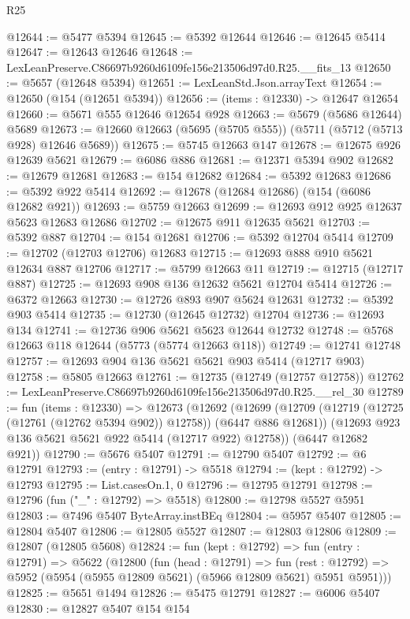 \begin{lexlean}{R25}
\begin{coremodule}
@12644 := @5477 @5394
@12645 := @5392 @12644
@12646 := @12645 @5414
@12647 := @12643 @12646
@12648 := LexLeanPreserve.C86697b9260d6109fe156e213506d97d0.R25.__fits_13
@12650 := @5657 (@12648 @5394)
@12651 := LexLeanStd.Json.arrayText
@12654 := @12650 (@154 (@12651 @5394))
@12656 := (items : @12330) -> @12647 @12654
@12660 := @5671 @555 @12646 @12654 @928
@12663 := @5679 (@5686 @12644) @5689
@12673 := @12660 @12663 (@5695 (@5705 @555)) (@5711 (@5712 (@5713 @928) @12646 @5689))
@12675 := @5745 @12663 @147
@12678 := @12675 @926 @12639 @5621
@12679 := @6086 @886
@12681 := @12371 @5394 @902
@12682 := @12679 @12681
@12683 := @154 @12682
@12684 := @5392 @12683
@12686 := @5392 @922 @5414
@12692 := @12678 (@12684 @12686) (@154 (@6086 @12682 @921))
@12693 := @5759 @12663
@12699 := @12693 @912 @925 @12637 @5623 @12683 @12686
@12702 := @12675 @911 @12635 @5621
@12703 := @5392 @887
@12704 := @154 @12681
@12706 := @5392 @12704 @5414
@12709 := @12702 (@12703 @12706) @12683
@12715 := @12693 @888 @910 @5621 @12634 @887 @12706
@12717 := @5799 @12663 @11
@12719 := @12715 (@12717 @887)
@12725 := @12693 @908 @136 @12632 @5621 @12704 @5414
@12726 := @6372 @12663
@12730 := @12726 @893 @907 @5624 @12631
@12732 := @5392 @903 @5414
@12735 := @12730 (@12645 @12732) @12704
@12736 := @12693 @134
@12741 := @12736 @906 @5621 @5623 @12644 @12732
@12748 := @5768 @12663 @118 @12644 (@5773 (@5774 @12663 @118))
@12749 := @12741 @12748
@12757 := @12693 @904 @136 @5621 @5621 @903 @5414 (@12717 @903)
@12758 := @5805 @12663
@12761 := @12735 (@12749 (@12757 @12758))
@12762 := LexLeanPreserve.C86697b9260d6109fe156e213506d97d0.R25.__rel_30
@12789 := fun (items : @12330) =>
  @12673
    (@12692
      (@12699
        (@12709 (@12719 (@12725 (@12761 (@12762 @5394 @902)) @12758)) (@6447 @886 @12681))
        (@12693 @923 @136 @5621 @5621 @922 @5414 (@12717 @922) @12758))
      (@6447 @12682 @921))
@12790 := @5676 @5407
@12791 := @12790 @5407
@12792 := @6 @12791
@12793 := (entry : @12791) -> @5518
@12794 := (kept : @12792) -> @12793
@12795 := List.casesOn.{1, 0}
@12796 := @12795 @12791
@12798 := @12796 (fun ("_" : @12792) => @5518)
@12800 := @12798 @5527 @5951
@12803 := @7496 @5407 ByteArray.instBEq
@12804 := @5957 @5407
@12805 := @12804 @5407
@12806 := @12805 @5527
@12807 := @12803 @12806
@12809 := @12807 (@12805 @5608)
@12824 := fun (kept : @12792) =>
  fun (entry : @12791) =>
  @5622
    (@12800
      (fun (head : @12791) =>
      fun (rest : @12792) => @5952 (@5954 (@5955 @12809 @5621) (@5966 @12809 @5621) @5951 @5951)))
@12825 := @5651 @1494
@12826 := @5475 @12791
@12827 := @6006 @5407
@12830 := @12827 @5407 @154 @154

\end{coremodule}
\end{lexlean}
